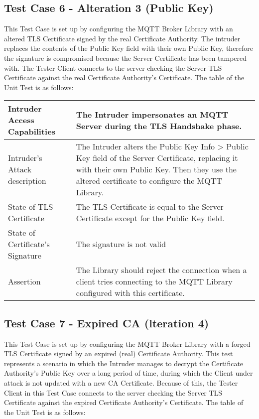 \documentclass[binding=0.6cm,noexaminfo]{sapthesis}
\begin{document}
\subsection{Test Case 6 - Alteration 3 (Public Key)}
This Test Case is set up by configuring the MQTT Broker Library with an altered TLS Certificate signed by the real Certificate Authority. The intruder replaces the contents of the Public Key field with their own Public Key, therefore the signature is compromised because the Server Certificate has been tampered with. The Tester Client connects to the server checking the Server TLS Certificate against the real Certificate Authority’s Certificate. The table of the Unit Test is as follows:

\begin{center}
\begin{tabular}{| p{6cm} | p{6cm} |}
\hline
Intruder Access Capabilities & The Intruder impersonates an MQTT Server during the TLS Handshake phase. \\
\hline
Intruder’s Attack description & The Intruder alters the Public Key Info > Public Key field of the Server Certificate, replacing it with their own Public Key. Then they use the altered certificate to configure the MQTT Library. \\
\hline
State of TLS Certificate & The TLS Certificate is equal to the Server Certificate except for the Public Key field. \\
\hline
State of Certificate’s Signature & The signature is not valid \\
\hline
Assertion & The Library should reject the connection when a client tries connecting to the MQTT Library configured with this certificate. \\
\hline
\end{tabular}
\end{center}

\subsection{Test Case 7 - Expired CA (lteration 4)}
This Test Case is set up by configuring the MQTT Broker Library with a forged TLS Certificate signed by an expired (real) Certificate Authority. This test represents a scenario in which the Intruder manages to decrypt the Certificate Authority’s Public Key over a long period of time, during which the Client under attack is not updated with a new CA Certificate. Because of this, the Tester Client in this Test Case connects to the server checking the Server TLS Certificate against the expired Certificate Authority’s Certificate. The table of the Unit Test is as follows:
\end{document}
